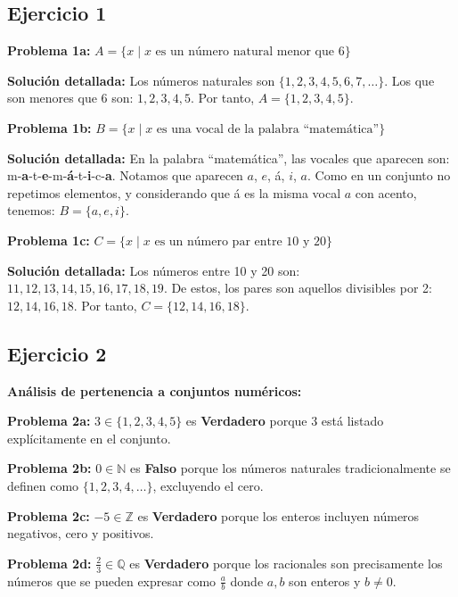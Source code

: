 
\subsection*{Ejercicio 1}

\textbf{Problema 1a:} $A = \{x \mid x \text{ es un número natural menor que 6}\}$

\textbf{Solución detallada:} Los números naturales son $\{1, 2, 3, 4, 5, 6, 7, \ldots\}$. Los que son menores que 6 son: $1, 2, 3, 4, 5$. Por tanto, $A = \{1, 2, 3, 4, 5\}$.

\textbf{Problema 1b:} $B = \{x \mid x \text{ es una vocal de la palabra ``matemática''}\}$

\textbf{Solución detallada:} En la palabra ``matemática'', las vocales que aparecen son: m-\textbf{a}-t-\textbf{e}-m-\textbf{á}-t-\textbf{i}-c-\textbf{a}. Notamos que aparecen $a$, $e$, á, $i$, $a$. Como en un conjunto no repetimos elementos, y considerando que á es la misma vocal $a$ con acento, tenemos: $B = \{a, e, i\}$.

\textbf{Problema 1c:} $C = \{x \mid x \text{ es un número par entre 10 y 20}\}$

\textbf{Solución detallada:} Los números entre 10 y 20 son: $11, 12, 13, 14, 15, 16, 17, 18, 19$. De estos, los pares son aquellos divisibles por 2: $12, 14, 16, 18$. Por tanto, $C = \{12, 14, 16, 18\}$.

\subsection*{Ejercicio 2}

\textbf{Análisis de pertenencia a conjuntos numéricos:}

\textbf{Problema 2a:} $3 \in \{1, 2, 3, 4, 5\}$ es \textbf{Verdadero} porque 3 está listado explícitamente en el conjunto.

\textbf{Problema 2b:} $0 \in \mathbb{N}$ es \textbf{Falso} porque los números naturales tradicionalmente se definen como $\{1, 2, 3, 4, \ldots\}$, excluyendo el cero.

\textbf{Problema 2c:} $-5 \in \mathbb{Z}$ es \textbf{Verdadero} porque los enteros incluyen números negativos, cero y positivos.

\textbf{Problema 2d:} $\frac{2}{3} \in \mathbb{Q}$ es \textbf{Verdadero} porque los racionales son precisamente los números que se pueden expresar como $\frac{a}{b}$ donde $a, b$ son enteros y $b \neq 0$.

